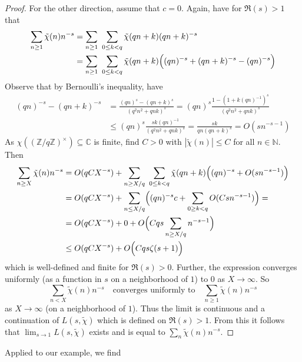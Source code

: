 \documentclass{scrartcl}
\newcommand{\N}{\mathbb{N}}
\newcommand{\Z}{\mathbb{Z}}
\newcommand{\C}{\mathbb{C}}
\newcommand{\units}{\times}
\theoremstyle{definition}
\begin{document}
\begin{proof}
    For the other direction, assume that $c = 0$.
    Again, have for $\Re(s) > 1$ that
    \begin{align*}
        \sum_{n \geq 1} \tilde{\chi}(n) n^{-s} &= \sum_{n \geq 1} \ \sum_{0 \leq k < q} \tilde{\chi}(qn + k) (qn + k)^{-s} \\
        &= \sum_{n \geq 1} \ \sum_{0 \leq k < q} \tilde{\chi}(qn + k) \Bigl( (qn)^{-s} + (qn + k)^{-s} - (qn)^{-s} \Bigr)
    \end{align*}
    Observe that by Bernoulli's inequality, have
    \begin{align*}
        (qn)^{-s} - (qn + k)^{-s} &= \frac {(qn)^s - (qn + k)^s} {(q^2n^2 + qnk)^s} = (qn)^{s} \frac {1 - (1 + k(qn)^{-1})^s} {(q^2n^2 + qnk)^s} \\
        &\leq (qn)^s \frac {sk(qn)^{-1}} {(q^2n^2 + qnk)^s} = \frac {sk} {qn(qn + k)^s} = O(sn^{-s - 1})
    \end{align*}
    As $\chi((\Z/q\Z)^\units) \subseteq \C$ is finite, find $C > 0$ with $|\tilde{\chi}(n)| \leq C$ for all $n \in \N$. Then
    \begin{align*}
        \sum_{n \geq X} \tilde{\chi}(n) n^{-s} &= O(qCX^{-s}) + \sum_{n \geq X/q} \ \sum_{0 \leq k < q} \tilde{\chi}(qn + k) \Bigl( (qn)^{-s} + O(sn^{-s - 1}) \Bigr) \\
        &= O(qCX^{-s}) + \sum_{n \leq X/q} \Bigl( (qn)^{-s} c + \sum_{0 \geq k < q} O(Csn^{-s - 1}) \Bigr) = \\
        &= O(qCX^{-s}) + 0 + O\Bigl( Cqs \sum_{n \geq X/q} n^{-s - 1} \Bigr) \\
        &\leq O(qCX^{-s}) + O\Bigl( Cqs\zeta(s + 1) \Bigr)
    \end{align*}
    which is well-defined and finite for $\Re(s) > 0$.
    Further, the expression converges uniformly (as a function in $s$ on a neighborhood of $1$) to $0$ as $X \to \infty$. 
    So
    \begin{equation*}
        \sum_{n < X} \tilde{\chi}(n) n^{-s} \quad \text{converges uniformly to} \quad \sum_{n \geq 1} \tilde{\chi}(n) n^{-s}
    \end{equation*}
    as $X \to \infty$ (on a neighborhood of $1$). 
    Thus the limit is continuous and a continuation of $L(s, \tilde{\chi})$ which is defined on $\Re(s) > 1$.
    From this it follows that $\lim_{s \to 1} L(s, \tilde{\chi})$ exists and is equal to $\sum_n \tilde{\chi}(n) n^{-s}$.
\end{proof}
Applied to our example, we find
\end{document}
